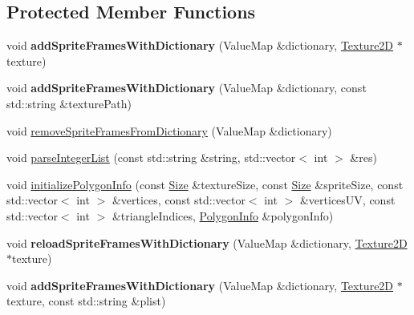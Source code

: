 \subsection*{Protected Member Functions}
\begin{DoxyCompactItemize}
\item 
\mbox{\label{classSpriteFrameCache_aa387abd308d32ac9a59285d3109816a0}} 
void {\bfseries add\+Sprite\+Frames\+With\+Dictionary} (Value\+Map \&dictionary, \hyperlink{classTexture2D}{Texture2D} $\ast$texture)
\item 
\mbox{\label{classSpriteFrameCache_a6ddaaa7338e569cd08763b3f7820c9b1}} 
void {\bfseries add\+Sprite\+Frames\+With\+Dictionary} (Value\+Map \&dictionary, const std\+::string \&texture\+Path)
\item 
void \hyperlink{classSpriteFrameCache_ad9903fd9759969671fefe7721f3a7071}{remove\+Sprite\+Frames\+From\+Dictionary} (Value\+Map \&dictionary)
\item 
void \hyperlink{classSpriteFrameCache_a22d62d43f4b058295c01f299353f3051}{parse\+Integer\+List} (const std\+::string \&string, std\+::vector$<$ int $>$ \&res)
\item 
void \hyperlink{classSpriteFrameCache_a3b4d6f3e1281bc0251699b156cf0b680}{initialize\+Polygon\+Info} (const \hyperlink{classSize}{Size} \&texture\+Size, const \hyperlink{classSize}{Size} \&sprite\+Size, const std\+::vector$<$ int $>$ \&vertices, const std\+::vector$<$ int $>$ \&vertices\+UV, const std\+::vector$<$ int $>$ \&triangle\+Indices, \hyperlink{classPolygonInfo}{Polygon\+Info} \&polygon\+Info)
\item 
\mbox{\label{classSpriteFrameCache_abd8b4fb366f6b5ff52420a9a7cab4fa1}} 
void {\bfseries reload\+Sprite\+Frames\+With\+Dictionary} (Value\+Map \&dictionary, \hyperlink{classTexture2D}{Texture2D} $\ast$texture)
\item 
\mbox{\label{classSpriteFrameCache_a1fbb687c4d4c27003a6475acdff9bace}} 
void {\bfseries add\+Sprite\+Frames\+With\+Dictionary} (Value\+Map \&dictionary, \hyperlink{classTexture2D}{Texture2D} $\ast$texture, const std\+::string \&plist)
\item 
\mbox{\label{classSpriteFrameCache_a223b65283fbe9a244e8e1864be59a51c}} 

\end{DoxyCompactItemize}
